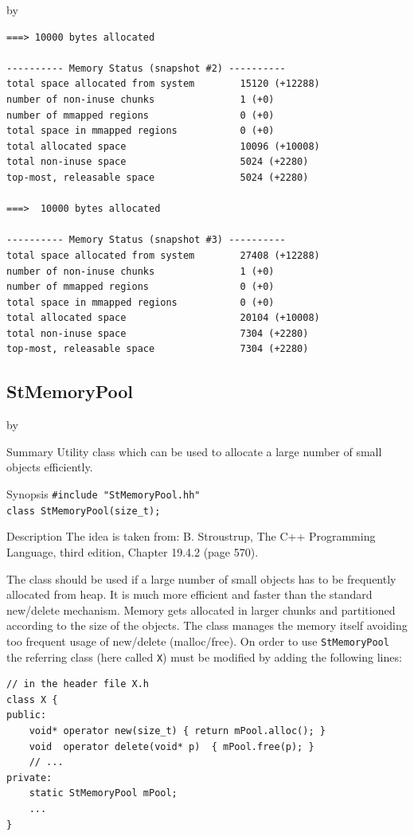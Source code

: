 \documentclass[twoside]{article}
\newcommand{\entrylabel}[1]{\mbox{\textbf{{#1}}}\hfil}%
\newenvironment{entry}
{\begin{list}{}%
    {\renewcommand{\makelabel}{\entrylabel}%
     \setlength{\labelwidth}{90pt}%
     \setlength{\leftmargin}{\labelwidth}
     \advance\leftmargin by \labelsep%
      }%
    }%
  {\end{list}}
\newcommand{\Entrylabel}[1]%
{\raisebox{0pt}[1ex][0pt]{\makebox[\labelwidth][l]%
    {\parbox[t]{\labelwidth}{\hspace{0pt}\textbf{{#1}}}}}}
\newenvironment{Entry}%
{\renewcommand{\entrylabel}{\Entrylabel}\begin{entry}}%
  {\end{entry}}
\begin{document}
\begin{description}
\begin{Entry}
{\begin{verbatim}
===> 10000 bytes allocated

---------- Memory Status (snapshot #2) ----------
total space allocated from system        15120 (+12288) 
number of non-inuse chunks               1 (+0) 
number of mmapped regions                0 (+0) 
total space in mmapped regions           0 (+0) 
total allocated space                    10096 (+10008) 
total non-inuse space                    5024 (+2280) 
top-most, releasable space               5024 (+2280) 

===>  10000 bytes allocated

---------- Memory Status (snapshot #3) ----------
total space allocated from system        27408 (+12288) 
number of non-inuse chunks               1 (+0) 
number of mmapped regions                0 (+0) 
total space in mmapped regions           0 (+0) 
total allocated space                    20104 (+10008) 
total non-inuse space                    7304 (+2280) 
top-most, releasable space               7304 (+2280) 
\end{verbatim}
} %
\end{Entry}

\clearpage

%
%
\subsection{StMemoryPool}
\label{StMemoryPool}
\begin{Entry}
\item[Summary]
  Utility class which can be used to allocate a large number of
  small objects efficiently.

\item[Synopsis]
    \verb+#include "StMemoryPool.hh"+\\
    \verb+class StMemoryPool(size_t);+
    
\item[Description]   
    The idea is taken from:
    B. Stroustrup, The C++ Programming Language, third edition,
    Chapter 19.4.2 (page 570).

    The class should be used if a large number of small objects
    has to be frequently allocated from heap. It is much more efficient and
    faster than the standard new/delete mechanism.
    Memory gets allocated in larger chunks and partitioned according to
    the size of the objects. The class manages the memory itself avoiding
    too frequent usage of new/delete (malloc/free).
    On order to use \texttt{StMemoryPool} the referring class
    (here called \texttt{X}) must be modified by adding the following lines:
\begin{verbatim}
// in the header file X.h
class X {
public:
    void* operator new(size_t) { return mPool.alloc(); }
    void  operator delete(void* p)  { mPool.free(p); }
    // ...
private:
    static StMemoryPool mPool;
    ...
}


\end{verbatim}
\end{Entry}
\end{description}
\end{document}
